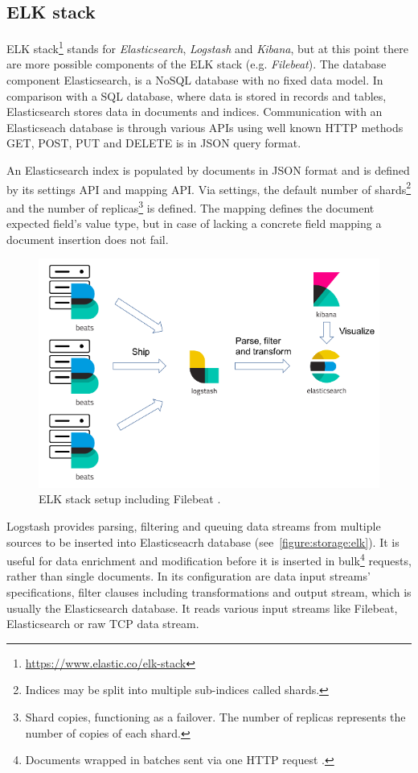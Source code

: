\documentclass[12pt,a4paper,twoside]{report}
\begin{document}
		\subsection{ELK stack} \label{analysis:storage:elastic}
			ELK stack\footnote{\url{https://www.elastic.co/elk-stack}} stands for \emph{Elasticsearch}, \emph{Logstash} and \emph{Kibana}, but at this point there are more possible components of the ELK stack (e.g. \emph{Filebeat}). The database component Elasticsearch, is a NoSQL database with no fixed data model. In comparison with a SQL database, where data is stored in records and tables, Elasticsearch stores data in documents and indices. Communication with an Elasticseach database is through various APIs using well known HTTP methods GET, POST, PUT and DELETE is in JSON query format.\par
			An Elasticsearch index is populated by documents in JSON format and is defined by its settings API and mapping API. Via settings, the default number of shards\footnote{Indices may be split into multiple sub-indices called shards.} and the number of replicas\footnote{Shard copies, functioning as a failover. The number of replicas represents the number of copies of each shard.} \cite{docs:elastic:terms} is defined. The mapping defines the document expected field's value type, but in case of lacking a concrete field mapping a document insertion does not fail.\par
			\begin{figure}
				\centering
				\includegraphics[scale=0.5]{logstash-filebeat}
				\caption{ELK stack setup including Filebeat \cite{image:elk}.}
				\label{figure:storage:elk}
			\end{figure}
			Logstash provides parsing, filtering and queuing data streams from multiple sources to be inserted into Elasticseacrh database (see~\autoref{figure:storage:elk}). It is useful for data enrichment and modification before it is inserted in bulk\footnote{Documents wrapped in batches sent via one HTTP request \cite{docs:elastic:bulk}.} requests, rather than single documents. In its configuration are data input streams' specifications, filter clauses including transformations and output stream, which is usually the Elasticsearch database. It reads various input streams like Filebeat, Elasticsearch or raw TCP data stream.\par
\end{document}

